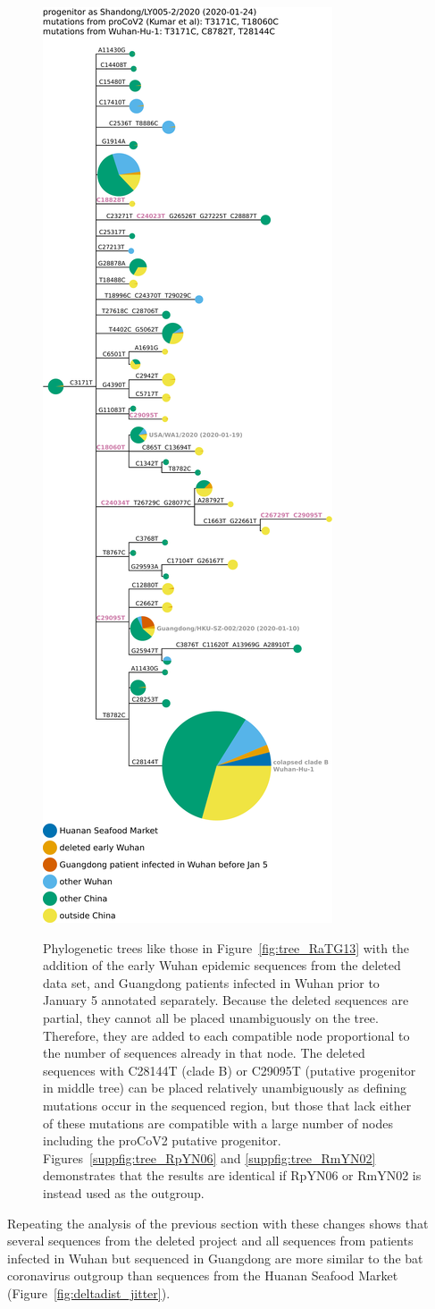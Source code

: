 \documentclass[9pt,twocolumn,twoside]{gsajnl_modified}
\begin{document}
\begin{figure}
{  \hspace{0.02\linewidth}
 \includegraphics[width=0.31\linewidth, valign=t, clip=true, trim=0in 6.75in 0in 0in]{figures/tree_images/hCoV-19-Shandong-LY005-2-2020_RaTG13_with_deleted_seqs.pdf}
 }
 \caption{
Phylogenetic trees like those in Figure~\ref{fig:tree_RaTG13} with the addition of the early Wuhan epidemic sequences from the deleted data set, and Guangdong patients infected in Wuhan prior to January 5 annotated separately.
Because the deleted sequences are partial, they cannot all be placed unambiguously on the tree.
Therefore, they are added to each compatible node proportional to the number of sequences already in that node.
The deleted sequences with C28144T (clade B) or C29095T (putative progenitor in middle tree) can be placed relatively unambiguously as defining mutations occur in the sequenced region, but those that lack either of these mutations are compatible with a large number of nodes including the proCoV2 putative progenitor.
 Figures~\ref{suppfig:tree_RpYN06} and \ref{suppfig:tree_RmYN02} demonstrates that the results are identical if RpYN06 or RmYN02 is instead used as the outgroup.
\label{fig:tree_with_deleted}
 }
 \end{figure}

Repeating the analysis of the previous section with these changes shows that several sequences from the deleted project and all sequences from patients infected in Wuhan but sequenced in Guangdong are more similar to the bat coronavirus outgroup than sequences from the Huanan Seafood Market (Figure~\ref{fig:deltadist_jitter}).
\end{document}
